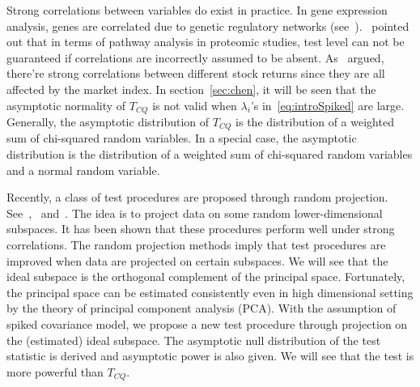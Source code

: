 \documentclass[review]{elsarticle}
\theoremstyle{plain}
\theoremstyle{definition}
\theoremstyle{remark}
\begin{document}
Strong correlations between variables do exist in practice. In gene expression analysis, genes are correlated due to genetic regulatory networks (see~\cite{Thulin2014A}).~\cite{Chen2011A} pointed out that in terms of pathway analysis in proteomic studies,  test level can not be guaranteed if correlations are incorrectly assumed to be absent.
 As~\cite{Ma2015A} argued, there're strong correlations between different stock returns since they are all affected by the market index.
In section~\ref{sec:chen}, it will be seen that the asymptotic normality of $T_{CQ}$ is not valid when $\lambda_i$'s in~\eqref{eq:introSpiked} are large.
Generally, the asymptotic distribution of $T_{CQ}$ is the distribution of a weighted sum of chi-squared random variables.
In a special case, the asymptotic distribution is the distribution of a weighted sum of chi-squared random variables and a normal random variable. 

Recently, a class of test procedures are proposed through random projection. See~\cite{Lopes2015A},~\cite{Thulin2014A} and~\cite{Srivastava2014RAPTT}. The idea is to project data on some random lower-dimensional subspaces. It has been shown that these
procedures perform well under strong correlations. 
The random projection methods imply that test procedures are improved when data are projected on certain subspaces.
We will see that the ideal subspace is the orthogonal complement of the principal space.
Fortunately, the principal space can be estimated consistently even in high dimensional setting by the theory of principal component analysis (PCA).
With the assumption of spiked covariance model, we propose a new test procedure through projection on the (estimated) ideal subspace.  
The asymptotic null distribution of the test statistic is derived and asymptotic power is also given.
We will see that the test is more powerful than $T_{CQ}$.
\end{document}
